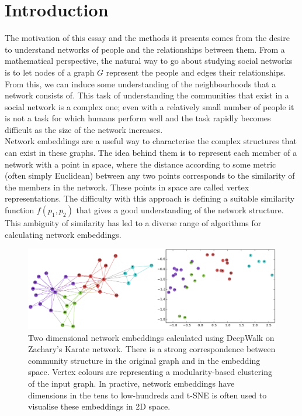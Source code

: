 \documentclass[a4paper]{article}
\begin{document}


\tableofcontents

\section{Introduction}
The motivation of this essay and the methods it presents comes from the desire to understand networks of people and the relationships between them.
From a mathematical perspective, the natural way to go about studying social networks is to let nodes of a graph $G$ represent the people and edges their relationships. From this, we can induce some understanding of the neighbourhoods that a network consists of. This task of understanding the communities that exist in a social network is a complex one; even with a relatively small number of people it is not a task for which humans perform well and the task rapidly becomes difficult as the size of the network increases.\\
Network embeddings are a useful way to characterise the complex structures that
can exist in these graphs. The idea behind them is to represent each member of a
network with a point in space, where the distance according to some metric
(often simply Euclidean) between any two points corresponds to the similarity of
the members in the network. These points in space are called vertex
representations. The difficulty with this approach is defining a suitable
similarity function $f(p_1,p_2)$ that gives a good understanding of the network
structure. This ambiguity of similarity has led to a diverse range of algorithms for calculating network embeddings.
\begin{figure}[h!]
  \centering
  \includegraphics[width = 1\textwidth]{src/DeepWalkOnKarateGraph.png}

  \caption{Two dimensional network embeddings calculated using
    DeepWalk\cite{deepwalk} on Zachary's Karate network\cite{zachary1977}. There is a strong
    correspondence between community structure in the original graph and
    in the embedding space. Vertex colours are representing a modularity-based
    clustering of the input graph. In practive, network embeddings have dimensions
    in the tens to low-hundreds and t-SNE\cite{maaten2008} is often used to visualise these embeddings in 2D
    space.}
\end{figure}\\
\end{document}
